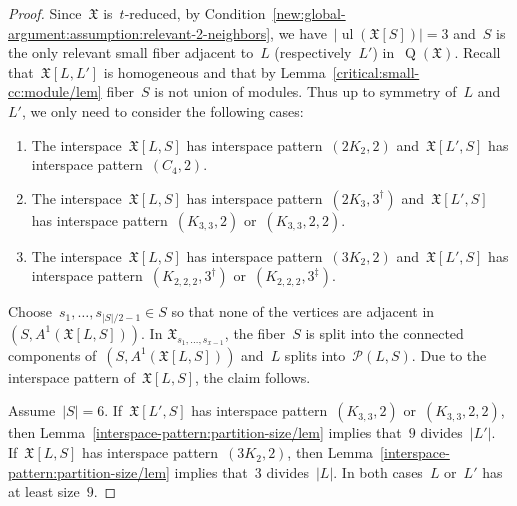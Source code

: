 \documentclass[english,a4paper]{article}
\theoremstyle{plain}
\theoremstyle{definition}
\newcommand{\abs}[1]{| #1 |}
\newcommand{\coherentConfig}{\ensuremath{\mathfrak{X}}}
\newcommand{\interspace}[2]{\ensuremath{\coherentConfig[#1,#2]}}
\newcommand{\inducedCC}[1]{\ensuremath{\coherentConfig[#1]}}
\DeclareMathOperator*{\ul}{ul}
\newcommand{\arcs}{\ensuremath{A}}
\DeclareMathOperator*{\Quotient}{Q}
\newcommand{\quotientGraph}[1]{\ensuremath{\Quotient(#1)}}
\newcommand{\equivalenceClasses}[1]{\ensuremath{\mathcal{P}(#1)}}
\newcommand{\ipfourMatching}{\ensuremath{(\disjointCliques{2}{2},2)}}
\newcommand{\ipfourCycle}   {\ensuremath{(\cycle{4},2)}}
\newcommand{\ipsixMatching}             {\ensuremath{(\disjointCliques{3}{2},2)}}
\newcommand{\ipsixTriangle}               {\ensuremath{(\disjointCliques{2}{3},3^\dag)}}
\newcommand{\ipsixTriangleComplement}     {\ensuremath{(\clique{3,3},2)}}
\newcommand{\ipsixTriangleComplementTwice}{\ensuremath{(\clique{3,3},2,2)}}
\newcommand{\ipsixMatchingComplement} {\ensuremath{(\clique{2,2,2},3^\dag)}}
\newcommand{\ipsixMatchingComplementD}{\ensuremath{(\clique{2,2,2},3^\ddag)}}
\newcommand{\clique}[1]{\ensuremath{K_{#1}}}
\newcommand{\cycle}[1]{\ensuremath{C_{#1}}}
\newcommand{\disjointCliques}[2]{\ensuremath{#1 \clique{#2}}}
\begin{document}
\begin{proof}
    Since~$\coherentConfig$ is~$t$-reduced, by Condition~\ref{new:global-argument:assumption:relevant-2-neighbors},
    we have~$\abs{\ul(\inducedCC{S})} = 3$ and~$S$ is the only relevant small fiber adjacent to~$L$ (respectively~$L'$) in~$\quotientGraph{\coherentConfig}$.
    Recall that~$\interspace{L}{L'}$ is homogeneous and that by Lemma~\ref{critical:small-cc:module/lem} fiber~$S$ is not union of modules.
    Thus up to symmetry of~$L$ and~$L'$, we only need to consider the following cases:
    \begin{enumerate}
        \item The interspace~$\interspace{L}{S}$ has interspace pattern~$\ipfourMatching$ and~$\interspace{L'}{S}$ has interspace pattern~$\ipfourCycle$.
        \item The interspace~$\interspace{L}{S}$ has interspace pattern~$\ipsixTriangle$  and~$\interspace{L'}{S}$ has interspace pattern~$\ipsixTriangleComplement$ or~$\ipsixTriangleComplementTwice$.
        \item The interspace~$\interspace{L}{S}$ has interspace pattern~$\ipsixMatching$  and~$\interspace{L'}{S}$ has interspace pattern~$\ipsixMatchingComplement$ or~$\ipsixMatchingComplementD$.
    \end{enumerate}
    Choose~$s_{1},\dots,s_{|S|/2 -1} \in S$ so that none of the vertices are adjacent in~$(S,\arcs^1(\interspace{L}{S}))$.
    In $\coherentConfig_{s_1,\dots,s_{x-1}}$, the fiber~$S$ is split into the connected components of~$(S,\arcs^1(\interspace{L}{S}))$ and~$L$ splits into~$\equivalenceClasses{L,S}$.
    Due to the interspace pattern of~$\interspace{L}{S}$, the claim follows.

    Assume~$|S| = 6$.
    If~$\interspace{L'}{S}$ has interspace pattern~$\ipsixTriangleComplement$ or~$\ipsixTriangleComplementTwice$, then Lemma~\ref{interspace-pattern:partition-size/lem} implies that~$9$ divides~$|L'|$.
    If~$\interspace{L}{S}$ has interspace pattern~$\ipsixMatching$, then Lemma~\ref{interspace-pattern:partition-size/lem} implies that~$3$ divides~$|L|$.
    In both cases~$L$ or~$L'$ has at least size~$9$.
\end{proof}
\end{document}
